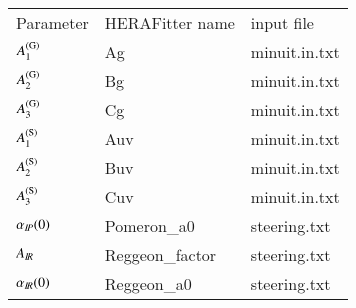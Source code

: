 \begin{tabular}{l|l|l}
Parameter & HERAFitter name & input file\\
$A^{(\mathrm G)}_1$ & Ag & minuit.in.txt \\
$A^{(\mathrm G)}_2$ & Bg & minuit.in.txt \\
$A^{(\mathrm G)}_3$ & Cg & minuit.in.txt \\
$A^{(\mathrm S)}_1$ & Auv & minuit.in.txt \\
$A^{(\mathrm S)}_2$ & Buv & minuit.in.txt \\
$A^{(\mathrm S)}_3$ & Cuv & minuit.in.txt \\
$\alpha_{I\!P}(0)$ & Pomeron\_a0 & steering.txt \\
$A_{I\!R}$ & Reggeon\_factor & steering.txt \\
$\alpha_{I\!R}(0)$ & Reggeon\_a0 & steering.txt \\
\end{tabular}




